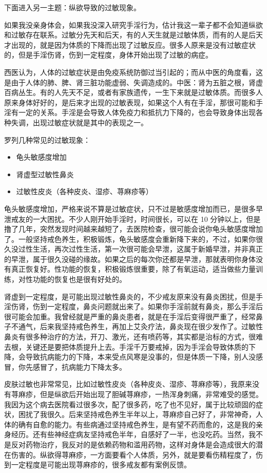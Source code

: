 \documentclass{ctexart}
\begin{document}
下面进入另一主题：纵欲导致的过敏现象。

如果我没亲身体会，如果我没深入研究手淫行为，估计我这一辈子都不会知道纵欲和过敏存在联系。过敏分先天和后天，有的人天生就是过敏体质，而有的人是后天才出现的，就是因为体质的下降而出现了过敏反应。很多人原来是没有过敏症状的，但是手淫伤肾，伤到一定程度，身体开始出现了过敏的病症。

西医认为，人体的过敏症状是由免疫系统防御过当引起的；而从中医的角度看，这是由于人体的肺、脾、肾三脏功能虚弱、失调造成的。中医：肾为五脏之根，肾虚百病丛生。有的人先天不足，或者有家族遗传，一生下来就是过敏体质。而很多人原来身体好好的，是后来才出现的过敏表现，如果这个人有在手淫，那很可能和手淫有一定的关系。手淫是会导致人体免疫力和抵抗力下降的，也会导致身体出现各种失调，出现过敏症状就是其中的表现之一。

罗列几种常见的过敏现象：

\begin{itemize}
    \item 龟头敏感度增加
    \item 肾虚型过敏性鼻炎
    \item 过敏性皮炎（各种皮炎、湿疹、荨麻疹等）
\end{itemize}

龟头敏感度增加，严格来说不算是过敏症状，只不过是敏感度增加而已，是很多早泄戒友的一大困扰。不少人刚开始手淫时，时间很长，可以在 10 分钟以上，但是撸了几年，突然发现时间越来越短了，去医院检查，很可能会说你龟头敏感度增加了。一般坚持戒色养生，积极锻炼，龟头敏感度会重新降下来的，不过，如果你很久没过性生活，再次过性生活，第一次很可能会早泄，这属于新婚早泄，并非真正的早泄，属于很久没碰的缘故。如果之后的每次你还都是早泄，那就表明你身体没有真正恢复好。性功能的恢复，积极锻炼很重要，除了有氧运动，适当做些力量训练，对性功能的恢复也是很有好处的。

肾虚到一定程度，是可能出现过敏性鼻炎的，不少戒友原来没有鼻炎困扰，但是手淫伤肾，伤到一定程度，鼻炎问题就出来了。如果你手淫前就有鼻炎，那么手淫后很可能会加重。我曾经就是严重的鼻炎患者，就是在手淫后变得很严重了，经常鼻子不通气，后来我坚持戒色养生，再加上艾灸疗法，鼻炎现在很少发作了。过敏性鼻炎有很多种治疗的方法，开刀、激光，还有喷药等，其实都是治标的方式，很难去根，关键还是要把体质提升上去。手淫千万要戒掉，因为手淫会导致体质的下降，会导致抗病能力的下降，本来受点风寒是没事的，但是体质一下降，别人没感冒，你先感冒了，抗病能力下降太多。

皮肤过敏也非常常见，比如过敏性皮炎（各种皮炎、湿疹、荨麻疹等），我原来没有荨麻疹，但是纵欲后开始出现了胆碱荨麻疹，一热浑身刺痛，非常难受的感觉。我因为这个病去医院看过很多次，配了很多药，吃了也不见好，属于比较顽固的症状，困扰了我很久。后来坚持戒色养生半年以上，荨麻疹自己好了，非常神奇，人体的确有自愈的能力。有些病通过坚持戒色养生，是有望不药而愈的，这是我的亲身经历。还有些神经症病友坚持戒色半年，自感好了一半，也没吃药。当然，我不是反对药物治疗，我反对的是依赖药物和滥用药物，这样对身体是会造成很大的潜在伤害的。纵欲得荨麻疹，一方面要看个人体质，另外，就是要看伤精程度了，伤到一定程度是可能出现荨麻疹的，很多戒友都有案例反馈。
\end{document}
